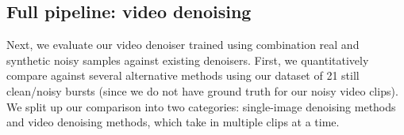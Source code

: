 \documentclass[final]{cvpr}
\begin{document}
\begin{comment}
\begin{table}[thb]
    \centering
    \newcolumntype{Z}{S[table-format=1.3,table-auto-round]}
	\begin{tabularx}{\linewidth}{*{7}{p{8.5mm}@{\hspace{2mm}}}Z@{}}
    \toprule
    \footnotesize read & \footnotesize shot & \footnotesize quant. & \footnotesize row & \footnotesize row t. & \footnotesize periodic & \footnotesize fixed & \footnotesize {KLD} \\
    \midrule
     & & & & & &                                        & 0.4000 \\
     &  & & & & &                                  & 0.4001 \\
     &  &  & & & &                            & 0.4048 \\
     &  &  &  &  & &                & 0.1184 \\
     &  &  &  &  &  &          & 0.1133 \\
     &  &  &  &  &  &     & 0.1375 \\
     &  &  &  &  &  &    & 0.0842 \\
    \midrule
    \multicolumn{7}{l}{Full model}                                 & \bfseries 0.0691 \\
    \bottomrule
    \end{tabularx}
    \caption{Ablation of noise components modeled by our noise generator.\stephan{What is the difference between last two rows before full model?}}
    \label{tab:noise_ablation}
\end{table}
\end{comment}











\subsection{Full pipeline: video denoising}
Next, we evaluate our video denoiser trained using combination real and synthetic noisy samples against existing denoisers. First, we quantitatively compare against several alternative methods using our dataset of 21 still clean/noisy bursts (since we do not have ground truth for our noisy video clips). We split up our comparison into two categories: single-image denoising methods and video denoising methods, which take in multiple clips at a time.
\end{document}
